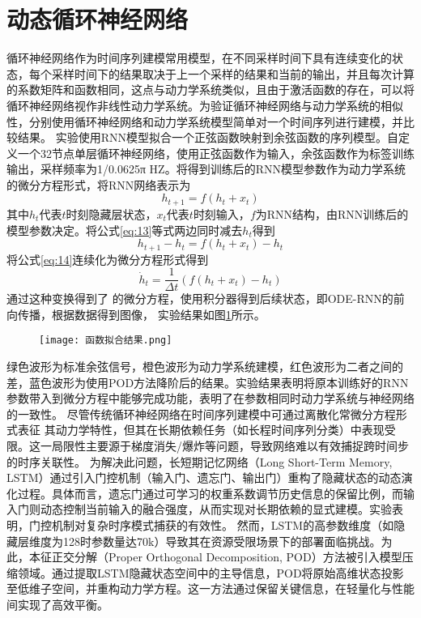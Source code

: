 \section{动态循环神经网络}
循环神经网络作为时间序列建模常用模型，在不同采样时间下具有连续变化的状态，每个采样时间下的结果取决于上一个采样的结果和当前的输出，并且每次计算的系数矩阵和函数相同，这点与动力学系统类似，且由于激活函数的存在，可以将循环神经网络视作非线性动力学系统。为验证循环神经网络与动力学系统的相似性，分别使用循环神经网络和动力学系统模型简单对一个时间序列进行建模，并比较结果。
实验使用RNN模型拟合一个正弦函数映射到余弦函数的序列模型。自定义一个32节点单层循环神经网络，使用正弦函数作为输入，余弦函数作为标签训练输出，采样频率为1/0.0625π HZ。将得到训练后的RNN模型参数作为动力学系统的微分方程形式，将RNN网络表示为
\begin{equation}
\label{eq:13}
{h_{t + 1}} = f({h_t} + {x_t})
\end{equation}
其中$h_t$代表$t$时刻隐藏层状态，$x_t$代表$t$时刻输入，$f$为RNN结构，由RNN训练后的模型参数决定。将公式\ref{eq:13}等式两边同时减去$h_t$得到
\begin{equation}
\label{eq:14}
{h_{t + 1}} - {h_t} = f({h_t} + {x_t}) - {h_t}
\end{equation}
将公式\ref{eq:14}连续化为微分方程形式得到
\begin{equation}
\label{eq:15}
  {\dot h_t} = \frac{1}{{\Delta t}}(f({h_t} + {x_t}) - {h_t})
\end{equation}
通过这种变换得到了 的微分方程，使用积分器得到后续状态，即ODE-RNN的前向传播，根据数据得到图像， 实验结果如图\ref{fig:函数拟合结果}所示。
\begin{figure}[!htbp]
  \centering
  \texttt{[image: 函数拟合结果.png]}
  \label{fig:函数拟合结果}
\end{figure}
绿色波形为标准余弦信号，橙色波形为动力学系统建模，红色波形为二者之间的差，蓝色波形为使用POD方法降阶后的结果。实验结果表明将原本训练好的RNN参数带入到微分方程中能够完成功能，表明了在参数相同时动力学系统与神经网络的一致性。
尽管传统循环神经网络在时间序列建模中可通过离散化常微分方程形式表征
其动力学特性，但其在长期依赖任务（如长程时间序列分类）中表现受限。这一局限性主要源于梯度消失/爆炸等问题，导致网络难以有效捕捉跨时间步的时序关联性。
为解决此问题，长短期记忆网络（Long Short-Term Memory, LSTM）\cite{hochreiter1997long}通过引入门控机制（输入门、遗忘门、输出门）重构了隐藏状态的动态演化过程。具体而言，遗忘门通过可学习的权重系数调节历史信息的保留比例，而输入门则动态控制当前输入的融合强度，从而实现对长期依赖的显式建模。实验表明，门控机制对复杂时序模式捕获的有效性。
然而，LSTM的高参数维度（如隐藏层维度为128时参数量达70k）导致其在资源受限场景下的部署面临挑战。为此，本征正交分解（Proper Orthogonal Decomposition, POD）方法被引入模型压缩领域。通过提取LSTM隐藏状态空间中的主导信息，POD将原始高维状态投影至低维子空间，并重构动力学方程。这一方法通过保留关键信息，在轻量化与性能间实现了高效平衡。

